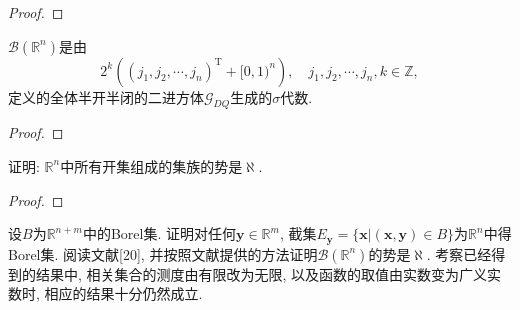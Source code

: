 \begin{quiza}
\begin{quizs}
\begin{proof}
\end{proof}
\item \(\mathscr{B}(\mathbb{R}^n)\)是由\[2^k\left(\left(j_1,j_2,\cdots,j_n\right)^\mathrm{T}+[0,1)^n\right),\quad j_1,j_2,\cdots,j_n,k\in\mathbb{Z},\]定义的全体半开半闭的二进方体\(\mathscr{G}_{DQ}\)生成的\(\sigma\)代数.
\begin{proof}
	
\end{proof}
\end{quizs}
\woe 证明: \(\mathbb{R}^n\)中所有开集组成的集族的势是\(\aleph\).
\begin{proof}
	
\end{proof}
\end{quiza}
\begin{quizb}
\woe 设\(B\)为\(\mathbb{R}^{n+m}\)中的Borel集. 证明对任何\(\boldsymbol{y}\in\mathbb{R}^m\), 截集\(E_{\boldsymbol{y}}=\{\boldsymbol{x}\big|(\boldsymbol{x},\boldsymbol{y})\in B\}\)为\(\mathbb{R}^n\)中得Borel集.
\woe 阅读文献[20], 并按照文献提供的方法证明\(\mathscr{B}(\mathbb{R}^n)\)的势是\(\aleph\).
\woe 考察已经得到的结果中, 相关集合的测度由有限改为无限, 以及函数的取值由实数变为广义实数时, 相应的结果十分仍然成立.
\end{quizb}
